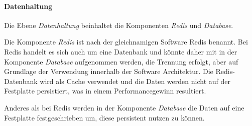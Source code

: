 \paragraph{Datenhaltung}
Die Ebene \textit{Datenhaltung} beinhaltet die Komponenten \textit{Redis} und \textit{Database}. 

Die Komponente \textit{Redis} ist nach der gleichnamigen Software Redis benannt. Bei Redis handelt es sich auch um eine Datenbank und könnte daher mit in der Komponente \textit{Database} aufgenommen werden, die Trennung erfolgt, aber auf Grundlage der Verwendung innerhalb der Software Architektur. Die Redis-Datenbank wird als Cache verwendet und die Daten werden nicht auf der Festplatte persistiert, was in einem Performancegewinn resultiert.

Anderes als bei Redis werden in der Komponente \textit{Database} die Daten auf eine Festplatte festgeschrieben um, diese persistent nutzen zu können.